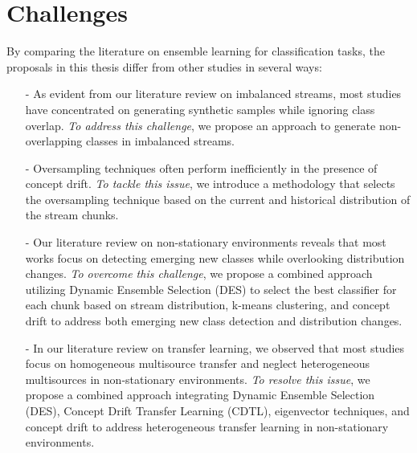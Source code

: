 \section{Challenges} 
\label{sec:3_7_remartks}

By comparing the literature on ensemble learning for classification tasks, the proposals in this thesis differ from other studies in several ways:

\begin{enumerate}
    
    \item [-] As evident from our literature review on imbalanced streams, most studies have concentrated on generating synthetic samples while ignoring class overlap. \textit{To address this challenge}, we propose an approach to generate non-overlapping classes in imbalanced streams.

    \item [-] Oversampling techniques often perform inefficiently in the presence of concept drift. \textit{To tackle this issue}, we introduce a methodology that selects the oversampling technique based on the current and historical distribution of the stream chunks.
    
    \item [-] Our literature review on non-stationary environments reveals that most works focus on detecting emerging new classes while overlooking distribution changes. \textit{To overcome this challenge}, we propose a combined approach utilizing Dynamic Ensemble Selection (DES) to select the best classifier for each chunk based on stream distribution, k-means clustering, and concept drift to address both emerging new class detection and distribution changes.
    
    \item [-] In our literature review on transfer learning, we observed that most studies focus on homogeneous multisource transfer and neglect heterogeneous multisources in non-stationary environments. \textit{To resolve this issue}, we propose a combined approach integrating Dynamic Ensemble Selection (DES), Concept Drift Transfer Learning (CDTL), eigenvector techniques, and concept drift to address heterogeneous transfer learning in non-stationary environments.

\end{enumerate}
